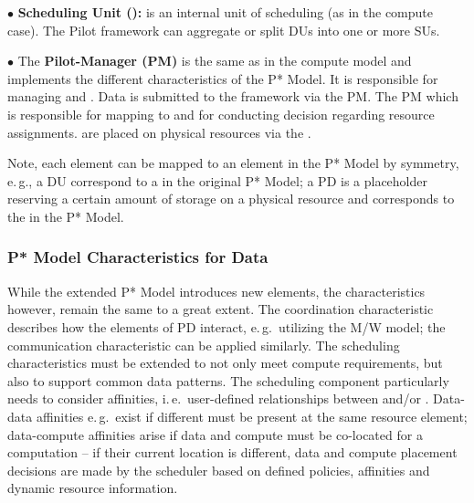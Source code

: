 \documentclass[conference]{IEEEtran}
\begin{document}
\noindent$\bullet$
  \textbf{Scheduling Unit (\su):} is an internal unit of scheduling (as in 
  the compute case). The Pilot framework can aggregate or split DUs into one 
  or more SUs.

\noindent$\bullet$ 
  The \textbf{Pilot-Manager (PM)} is the same as in the compute model and
  implements the different characteristics of the P* Model. It is responsible for
  managing \dus and \sus. Data is submitted to the framework via the PM. The PM
  which is responsible for mapping \dus to \sus and for conducting decision 
  regarding resource assignments. \sus are placed on physical resources via the \pilot.

Note, each element can be mapped to an element in the P* Model by
symmetry, e.\,g., a DU correspond to a \cu  in the original P* Model; 
a PD is a placeholder reserving a certain amount of storage on a physical 
resource and corresponds to the \pilot in the P* Model.



\subsubsection*{P* Model Characteristics for Data}

While the extended P* Model introduces new elements, the
characteristics however, remain the same to a great extent. The
coordination characteristic describes how the elements of PD interact,
e.\,g.\ utilizing the M/W model; the communication characteristic can
be applied similarly. The scheduling characteristics must be extended
to not only meet compute requirements, but also to support common data
patterns. The scheduling component particularly needs to consider
affinities, i.\,e.\ user-defined relationships between \cus and/or
\dus. Data-data affinities e.\,g.\ exist if different \dus must be
present at the same resource element; data-compute affinities arise if
data and compute must be co-located for a computation -- if their
current location is different, data and compute placement decisions
are made by the scheduler based on defined policies, affinities and
dynamic resource information.
\end{document}
